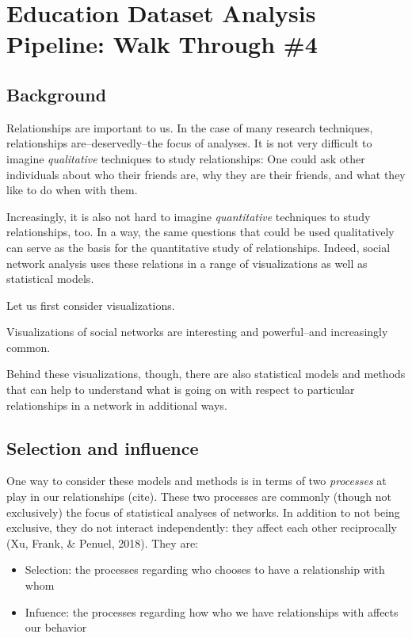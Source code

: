 \documentclass[]{book}
\providecommand{\tightlist}{%
  \setlength{\itemsep}{0pt}\setlength{\parskip}{0pt}}
\begin{document}
\chapter{Education Dataset Analysis Pipeline: Walk Through
\#4}\label{education-dataset-analysis-pipeline-walk-through-4}

\section{Background}\label{background-1}

Relationships are important to us. In the case of many research
techniques, relationships are--deservedly--the focus of analyses. It is
not very difficult to imagine \emph{qualitative} techniques to study
relationships: One could ask other individuals about who their friends
are, why they are their friends, and what they like to do when with
them.

Increasingly, it is also not hard to imagine \emph{quantitative}
techniques to study relationships, too. In a way, the same questions
that could be used qualitatively can serve as the basis for the
quantitative study of relationships. Indeed, social network analysis
uses these relations in a range of visualizations as well as statistical
models.

Let us first consider visualizations.

Visualizations of social networks are interesting and powerful--and
increasingly common.

Behind these visualizations, though, there are also statistical models
and methods that can help to understand what is going on with respect to
particular relationships in a network in additional ways.

\section{Selection and influence}\label{selection-and-influence}

One way to consider these models and methods is in terms of two
\emph{processes} at play in our relationships (cite). These two
processes are commonly (though not exclusively) the focus of statistical
analyses of networks. In addition to not being exclusive, they do not
interact independently: they affect each other reciprocally (Xu, Frank,
\& Penuel, 2018). They are:

\begin{itemize}
\tightlist
\item
  Selection: the processes regarding who chooses to have a relationship
  with whom
\item
  Infuence: the processes regarding how who we have relationships with
  affects our behavior
\end{itemize}
\end{document}

